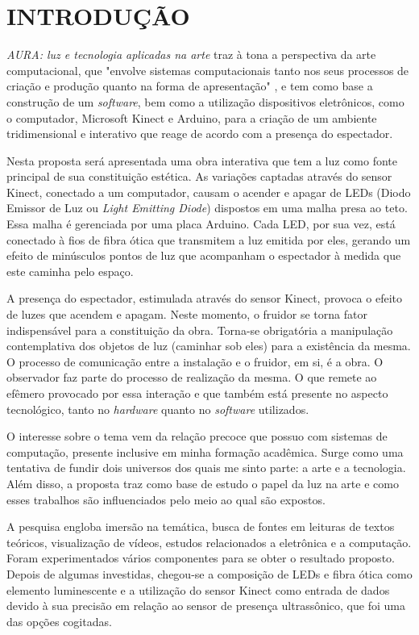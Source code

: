 %
%

\chapter{INTRODUÇÃO}\label{chap:introducao}

\textit{AURA: luz e tecnologia aplicadas na arte} traz à tona a perspectiva da arte computacional, que "envolve sistemas computacionais tanto nos seus processos de criação e produção quanto na forma de apresentação" \cite[p. 36]{boone}, e tem como base a construção de um \textit{software}, bem como a utilização dispositivos eletrônicos, como o computador, Microsoft Kinect e Arduino, para a criação de um ambiente tridimensional e interativo que reage de acordo com a presença do espectador.

Nesta proposta será apresentada uma obra interativa que tem a luz como fonte principal de sua constituição estética. As variações captadas através do sensor Kinect, conectado a um computador, causam o acender e apagar de LEDs (Diodo Emissor de Luz ou \textit{Light Emitting Diode}) dispostos em uma malha presa ao teto. Essa malha é gerenciada por uma placa Arduino. Cada LED, por sua vez, está conectado à fios de fibra ótica que transmitem a luz emitida por eles, gerando um efeito de minúsculos pontos de luz que acompanham o espectador à medida que este caminha pelo espaço.

A presença do espectador, estimulada através do sensor Kinect, provoca o efeito de luzes que acendem e apagam. Neste momento, o fruidor se torna fator indispensável para a constituição da obra. Torna-se obrigatória a manipulação contemplativa dos objetos de luz  (caminhar sob eles) para a existência da mesma. O processo de comunicação entre a instalação e o fruidor, em si, é a obra. O observador faz parte do processo de realização da mesma. O que remete ao efêmero provocado por essa interação e que também está presente no aspecto tecnológico, tanto no \textit{hardware} quanto no \textit{software} utilizados. 

O interesse sobre o tema vem da relação precoce que possuo com sistemas de computação, presente inclusive em minha formação acadêmica. Surge como uma tentativa de fundir dois universos dos quais me sinto parte: a arte e a tecnologia. Além disso, a proposta traz como base de estudo o papel da luz na arte e como esses trabalhos são influenciados pelo meio ao qual são expostos.

A pesquisa engloba imersão na temática, busca de fontes em leituras de textos teóricos, visualização de vídeos, estudos relacionados a eletrônica e a computação. Foram experimentados vários componentes para se obter o resultado proposto. Depois de algumas investidas, chegou-se a composição de LEDs e fibra ótica como elemento luminescente e a utilização do sensor Kinect como entrada de dados devido à sua precisão em relação ao sensor de presença ultrassônico, que foi uma das opções cogitadas.